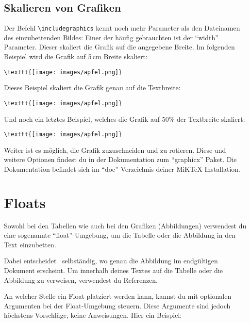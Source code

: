 \subsection{Skalieren von Grafiken}

Der Befehl \texttt{\textbackslash includegraphics} kennt noch mehr Parameter als den Dateinamen des einzubettenden Bildes: Einer der häufig gebrauchten ist der \enquote{width} Parameter. Dieser skaliert die Grafik auf die angegebene Breite. Im folgenden Beispiel wird die Grafik auf 5\,cm Breite skaliert:

\begin{lstlisting}
\texttt{[image: images/apfel.png]}
\end{lstlisting}

Dieses Beispiel skaliert die Grafik genau auf die Textbreite: 

\begin{lstlisting}
\texttt{[image: images/apfel.png]}
\end{lstlisting}

Und noch ein letztes Beispiel, welches die Grafik auf 50\% der Textbreite skaliert:

\begin{lstlisting}
\texttt{[image: images/apfel.png]}
\end{lstlisting}

Weiter ist es möglich, die Grafik zuzuschneiden und zu rotieren. Diese und weitere Optionen findest du in der Dokumentation zum \enquote{graphicx} Paket. Die Dokumentation befindet sich im \enquote{doc} Verzeichnis deiner MiKTeX Installation.




\section{Floats}

Sowohl bei den Tabellen wie auch bei den Grafiken (Abbildungen) verwendest du eine sogenannte \enquote{float}-Umgebung, um die Tabelle oder die Abbildung in den Text einzubetten.

Dabei entscheidet \DMLLaTeX \ selbständig, wo genau die Abbildung im endgültigen Dokument erscheint. Um innerhalb deines Textes auf die Tabelle oder die Abbildung zu verweisen, verwendest du Referenzen.

An welcher Stelle ein Float platziert werden kann, kannst du mit optionalen Argumenten bei der Float-Umgebung steuern. Diese Argumente sind jedoch höchstens Vorschläge, keine Anweisungen. Hier ein Beispiel:

